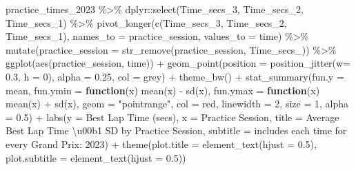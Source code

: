 \documentclass[
]{book}
\newenvironment{Shaded}{\begin{snugshade}}{\end{snugshade}}
\newcommand{\AttributeTok}[1]{\textcolor[rgb]{0.77,0.63,0.00}{#1}}
\newcommand{\ControlFlowTok}[1]{\textcolor[rgb]{0.13,0.29,0.53}{\textbf{#1}}}
\newcommand{\DecValTok}[1]{\textcolor[rgb]{0.00,0.00,0.81}{#1}}
\newcommand{\FloatTok}[1]{\textcolor[rgb]{0.00,0.00,0.81}{#1}}
\newcommand{\FunctionTok}[1]{\textcolor[rgb]{0.00,0.00,0.00}{#1}}
\newcommand{\NormalTok}[1]{#1}
\newcommand{\SpecialCharTok}[1]{\textcolor[rgb]{0.00,0.00,0.00}{#1}}
\newcommand{\StringTok}[1]{\textcolor[rgb]{0.31,0.60,0.02}{#1}}
\begin{document}
\begin{Shaded}
\begin{Highlighting}[]
\NormalTok{practice\_times\_2023 }\SpecialCharTok{\%\textgreater{}\%}
\NormalTok{  dplyr}\SpecialCharTok{::}\FunctionTok{select}\NormalTok{(Time\_secs\_3, Time\_secs\_2, Time\_secs\_1) }\SpecialCharTok{\%\textgreater{}\%}
  \FunctionTok{pivot\_longer}\NormalTok{(}\FunctionTok{c}\NormalTok{(Time\_secs\_3, Time\_secs\_2, Time\_secs\_1), }\AttributeTok{names\_to =} \StringTok{\textquotesingle{}practice\_session\textquotesingle{}}\NormalTok{, }\AttributeTok{values\_to =} \StringTok{\textquotesingle{}time\textquotesingle{}}\NormalTok{) }\SpecialCharTok{\%\textgreater{}\%}
  \FunctionTok{mutate}\NormalTok{(}\AttributeTok{practice\_session =} \FunctionTok{str\_remove}\NormalTok{(practice\_session, }\StringTok{\textquotesingle{}Time\_secs\_\textquotesingle{}}\NormalTok{)) }\SpecialCharTok{\%\textgreater{}\%}
  \FunctionTok{ggplot}\NormalTok{(}\FunctionTok{aes}\NormalTok{(practice\_session, time)) }\SpecialCharTok{+}
  \FunctionTok{geom\_point}\NormalTok{(}\AttributeTok{position =} \FunctionTok{position\_jitter}\NormalTok{(}\AttributeTok{w=} \FloatTok{0.3}\NormalTok{, }\AttributeTok{h =} \DecValTok{0}\NormalTok{), }\AttributeTok{alpha =} \FloatTok{0.25}\NormalTok{, }\AttributeTok{col =} \StringTok{\textquotesingle{}grey\textquotesingle{}}\NormalTok{) }\SpecialCharTok{+}
  \FunctionTok{theme\_bw}\NormalTok{() }\SpecialCharTok{+}
  \FunctionTok{stat\_summary}\NormalTok{(}\AttributeTok{fun.y =}\NormalTok{ mean,}
               \AttributeTok{fun.ymin =} \ControlFlowTok{function}\NormalTok{(x) }\FunctionTok{mean}\NormalTok{(x) }\SpecialCharTok{{-}} \FunctionTok{sd}\NormalTok{(x), }
               \AttributeTok{fun.ymax =} \ControlFlowTok{function}\NormalTok{(x) }\FunctionTok{mean}\NormalTok{(x) }\SpecialCharTok{+} \FunctionTok{sd}\NormalTok{(x), }
               \AttributeTok{geom =} \StringTok{"pointrange"}\NormalTok{, }
               \AttributeTok{col =} \StringTok{\textquotesingle{}red\textquotesingle{}}\NormalTok{, }\AttributeTok{linewidth =} \DecValTok{2}\NormalTok{, }\AttributeTok{size =} \DecValTok{1}\NormalTok{, }\AttributeTok{alpha =} \FloatTok{0.5}\NormalTok{) }\SpecialCharTok{+}
  \FunctionTok{labs}\NormalTok{(}\AttributeTok{y =} \StringTok{\textquotesingle{}Best Lap Time (secs)\textquotesingle{}}\NormalTok{,}
       \AttributeTok{x =} \StringTok{\textquotesingle{}Practice Session\textquotesingle{}}\NormalTok{,}
       \AttributeTok{title =} \StringTok{\textquotesingle{}Average Best Lap Time \textbackslash{}u00b1 SD by Practice Session\textquotesingle{}}\NormalTok{,}
       \AttributeTok{subtitle =} \StringTok{\textquotesingle{}includes each time for every Grand Prix: 2023\textquotesingle{}}\NormalTok{) }\SpecialCharTok{+}
  \FunctionTok{theme}\NormalTok{(}\AttributeTok{plot.title =} \FunctionTok{element\_text}\NormalTok{(}\AttributeTok{hjust =} \FloatTok{0.5}\NormalTok{),}
        \AttributeTok{plot.subtitle =} \FunctionTok{element\_text}\NormalTok{(}\AttributeTok{hjust =} \FloatTok{0.5}\NormalTok{))}
\end{Highlighting}
\end{Shaded}
\end{document}
